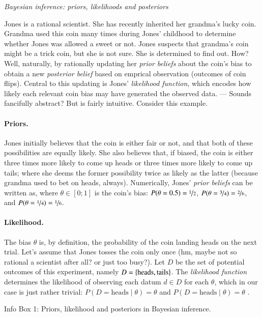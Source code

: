 \documentclass[nobib]{tufte-handout}
\begin{document}
\begin{InfoBox}[t]
\centering
\colorbox{mygray}{\centering
  \begin{minipage}{1.0\textwidth}

    \emph{Bayesian inference: priors, likelihoods and posteriors}
    \medskip

    Jones is a rational scientist. She has recently inherited her grandma's lucky coin. Grandma
    used this coin many times during Jones' childhood to determine whether Jones was allowed a
    sweet or not. Jones suspects that grandma's coin might be a trick coin, but she is not
    sure. She is determined to find out. How? Well, naturally, by rationally updating her
    \emph{prior beliefs} about the coin's bias to obtain a new \emph{posterior belief} based on
    emprical observation (outcomes of coin flips). Central to this updating is Jones'
    \emph{likelihood function}, which encodes how likely each relevant coin bias may have
    generated the observed data. --- Sounds fancifully abstract? But is fairly intuitive.
    Consider this example.
    
    \paragraph{Priors.} Jones initially believes that the coin is either fair or not, and that
    both of these possibilities are equally likely. She also believes that, if biased, the coin
    is either three times more likely to come up heads or three times more likely to come up
    tails; where she deems the former possibility twice as likely as the latter (because
    grandma used to bet on heads, always). Numerically, Jones' \emph{prior beliefs} can be
    written as, where $\theta \in [0;1]$ is the coin's bias: $P(\theta = 0.5) =
    \nicefrac{1}{2}$, $P(\theta = \nicefrac{3}{4}) = \nicefrac{2}{6}$, and $P(\theta =
    \nicefrac{1}{4}) = \nicefrac{1}{6}$.

    \paragraph{Likelihood.} The bias $\theta$ is, by definition, the probability of the coin
    landing heads on the next trial. Let's assume that Jones tosses the coin only once (hm,
    maybe not so rational a scientist after all? or just too busy?). Let $D$ be the set of
    potential outcomes of this experiment, namely $D = \left\{\text{heads}, \text{tails}\right\}$. The
    \emph{likelihood function} determines the likelihood of observing each datum $d \in D$ for
    each $\theta$, which in our case is just rather trivial: $P(D = \text{heads} \mid \theta) =
    \theta$ and $P(D = \text{heads} \mid \theta) = \theta$ .


  \end{minipage} \par
  } \par
  \begin{center}
    Info Box 1: Priors, likelihood and posteriors in Bayesian inference.
  \end{center}
\end{InfoBox}






\printbibliography[heading=bibintoc]
\end{document}
